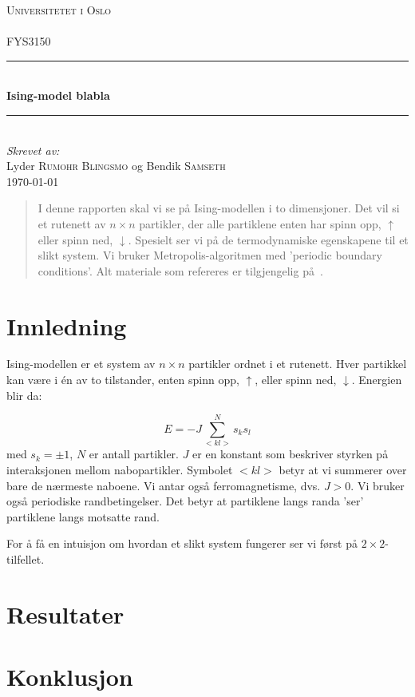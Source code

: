 \documentclass[11pt]{article}
\begin{document}
\begin{titlepage}
  \newcommand{\HRule}{\rule{\linewidth}{0.5mm}}
  \center
  \textsc{\LARGE Universitetet i Oslo}\\[1.5cm] %
  \textsc{\Large }\\[0.5cm] %
  \textsc{\large FYS3150}\\[0.5cm] %
  \HRule \\[0.4cm]
  { \huge \bfseries Ising-model blabla}\\[0.4cm]
  \HRule \\[1.5cm]
  \Large \emph{Skrevet av:}\\
  Lyder \textsc{Rumohr Blingsmo} og Bendik \textsc{Samseth}\\[3cm]
  {\large \today}\\[3cm]
  \vfill
\end{titlepage}

\begin{abstract}
I denne rapporten skal vi se på Ising-modellen i to dimensjoner. Det vil si
et rutenett av $n \times n $ partikler, der alle partiklene enten har
spinn opp, $\uparrow$ eller spinn ned, $\downarrow$. Spesielt ser vi
på de termodynamiske egenskapene til et slikt system. Vi bruker
Metropolis-algoritmen med 'periodic boundary conditions'. Alt materiale 
som refereres er tilgjengelig på~\cite{github-repo}. 
\end{abstract}

\section{Innledning}
\label{sec:innledning}
Ising-modellen er et system av $n \times n$ partikler ordnet i et rutenett. 
Hver partikkel kan være i én av to tilstander, enten spinn opp, $\uparrow$,
eller spinn ned, $\downarrow$. Energien blir da: 

\begin{equation}
  E=-J\sum_{<kl>}^{N}s_ks_l
\end{equation}
med  $s_k=\pm 1$, $N$ er antall partikler.
$J$ er en konstant som beskriver styrken på interaksjonen mellom
nabopartikler. Symbolet $<kl>$ betyr at vi summerer over bare de
nærmeste naboene. Vi antar også  ferromagnetisme, dvs.  $J> 0$. Vi bruker også
periodiske randbetingelser. Det betyr at partiklene langs randa 'ser' 
partiklene langs motsatte rand.

For å få en intuisjon om hvordan et slikt system fungerer ser vi først på 
$2 \times 2$-tilfellet. 



\section{Resultater}
\section{Konklusjon}

\clearpage
\printbibliography
\end{document}

